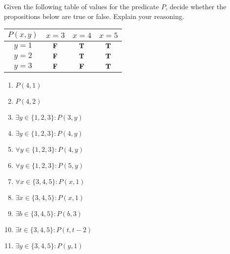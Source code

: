 	
	\begin{xca}
		
		Given the following table of values for the predicate $P$, decide whether the propositions below are true or false.  Explain your reasoning.
		
						\begin{table}[h!]
			\begin{center}
				\label{tab:table1}
				\begin{tabular}{c|c|c|c|}
					$P(x,y)$ &$x=3$ & $x=4$ & $x=5$  \\
					\hline
					$y=1$    &   $\textbf{\textrm{F}}$        &     $\textbf{\textrm{T}}$       &     $\textbf{\textrm{T}}$      \\
					\hline
					$y=2$   &    $\textbf{\textrm{F}}$       &     $\textbf{\textrm{T}}$        &    $\textbf{\textrm{T}}$      \\
					\hline
					$y=3$   &    $\textbf{\textrm{F}}$       &      $\textbf{\textrm{F}}$        &   $\textbf{\textrm{T}}$       \\
					\hline
				\end{tabular}
			\end{center}
		\end{table}
	
				\begin{enumerate}
		\item $P(4,1)$
		\item $P(4,2)$
		\item $\exists y \in \{1,2,3\}: P(3,y)$
		\item $\exists y  \in \{1,2,3\}: P(4,y)$
		\item $\forall y  \in \{1,2,3\}: P(4,y)$
		\item $\forall y  \in \{1,2,3\}: P(5,y)$
		\item $\forall x  \in \{3,4,5\}: P(x, 1)$
		\item $\exists x  \in \{3,4,5\}: P(x,1)$
		\item $\exists b  \in \{3,4,5\}: P(b, 3)$
		\item $\exists t  \in \{3,4,5\}: P(t, t-2)$
		\item $\exists y  \in \{3,4,5\}: P(y,1)$
	\end{enumerate}
		

	\end{xca}

